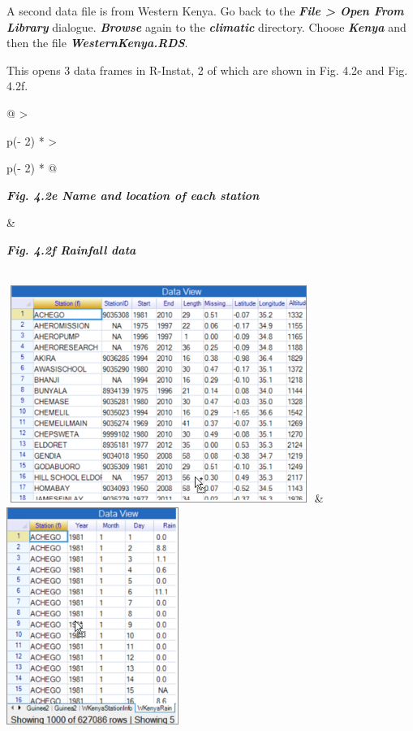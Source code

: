 \documentclass[
  letterpaper,
  DIV=11,
  numbers=noendperiod]{scrreprt}
\begin{document}
A second data file is from Western Kenya. Go back to the
\textbf{\emph{File \textgreater{} Open From Library}} dialogue.
\textbf{\emph{Browse}} again to the \textbf{\emph{climatic}} directory.
Choose \textbf{\emph{Kenya}} and then the file
\textbf{\emph{WesternKenya.RDS}}.

This opens 3 data frames in R-Instat, 2 of which are shown in Fig. 4.2e
and Fig. 4.2f.

\begin{longtable}[]{@{}
  >{\raggedright\arraybackslash}p{(\columnwidth - 2\tabcolsep) * }
  >{\raggedright\arraybackslash}p{(\columnwidth - 2\tabcolsep) * }@{}}
\toprule\noalign{}
\begin{minipage}[b]{\linewidth}\raggedright
\textbf{\emph{Fig. 4.2e Name and location of each station}}
\end{minipage} & \begin{minipage}[b]{\linewidth}\raggedright
\textbf{\emph{Fig. 4.2f Rainfall data}}
\end{minipage} \\
\midrule\noalign{}
\endhead
\bottomrule\noalign{}
\endlastfoot
\includegraphics[width=3.90665in,height=2.77973in]{figures/Fig4.2e.png}
&
\includegraphics[width=2.21072in,height=2.81451in]{figures/Fig4.2f.png} \\
\end{longtable}
\end{document}
